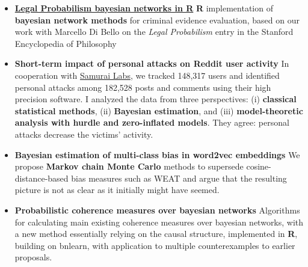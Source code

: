 \documentclass[10pt, a4paper]{article}
\begin{document}
\vspace{-6mm}

\begin{itemize} [leftmargin=*]
	
	
	
\item 	\href{https://rfl-urbaniak.github.io/LegalProbabilismBNs/}{\textbf{Legal Probabilism bayesian networks in R}} 
 \newline  \scriptsize \textbf{\textsf{R}} implementation  of \textbf{bayesian network methods} for criminal evidence evaluation, based on our work with  Marcello Di Bello on the \newline \emph{Legal  Probabilism} entry in the Stanford Encyclopedia of Philosophy


\normalsize 
\item 	%
	\textbf{Short-term impact of personal attacks on Reddit user  activity}%
\newline  \scriptsize  In cooperation with \href{https://www.samurailabs.ai/}{Samurai Labs}, we tracked 148,317 users  and identified personal attacks among 182,528 posts and comments  using their high precision software. I  analyzed the data  from three perspectives: (i) \textbf{classical statistical methods}, (ii) \textbf{Bayesian estimation}, and (iii) \textbf{model-theoretic analysis with hurdle and zero-inflated models}. They  agree: personal attacks decrease the victims' activity.

\normalsize 
\item 	%
\textbf{Bayesian estimation of multi-class bias in word2vec embeddings}%
\newline  \scriptsize We  propose \textbf{Markov chain Monte Carlo} methods  to supersede cosine-distance-based bias measures such as WEAT and argue that the resulting picture is not as clear as it initially might have seemed. 



\normalsize 
\item 	%
\textbf{Probabilistic coherence measures over bayesian networks}%
\newline  \scriptsize Algorithms for calculating  main existing coherence measures over bayesian networks, with a new method essentially relying on the causal structure,  implemented in \textbf{\textsf{R}}, building on \textsf{bnlearn}, with application to multiple counterexamples to earlier proposals.





\end{itemize}
\end{document}
